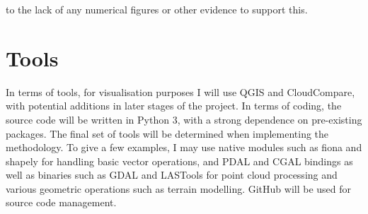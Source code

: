 to the lack of any numerical figures or other evidence to support this.

\section*{Tools}

In terms of tools, for visualisation purposes I will use QGIS and CloudCompare, with potential additions in later stages of the project. In terms of coding, the source code will be written in Python 3, with a strong dependence on pre-existing packages. The final set of tools will be determined when implementing the methodology. To give a few examples, I may use native modules such as fiona and shapely for handling basic vector operations, and PDAL and CGAL bindings as well as binaries such as GDAL and LASTools for point cloud processing and various geometric operations such as terrain modelling. GitHub will be used for source code management.